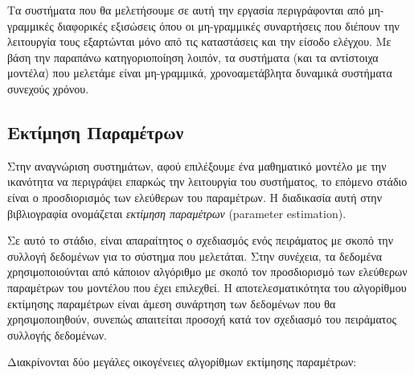 \begin{itemize}
{	
	
	}
\end{itemize}

Τα συστήματα που θα μελετήσουμε σε αυτή την εργασία περιγράφονται από μη-γραμμικές διαφορικές εξισώσεις όπου οι μη-γραμμικές συναρτήσεις που διέπουν την λειτουργία τους εξαρτώνται μόνο από τις καταστάσεις και την είσοδο ελέγχου. Με βάση την παραπάνω κατηγοριοποίηση λοιπόν, τα συστήματα (και τα αντίστοιχα μοντέλα) που μελετάμε είναι μη-γραμμικά, χρονοαμετάβλητα δυναμικά συστήματα συνεχούς χρόνου.

\pagebreak
\subsection{Εκτίμηση Παραμέτρων}
Στην αναγνώριση συστημάτων, αφού επιλέξουμε ένα μαθηματικό μοντέλο με την ικανότητα να περιγράψει επαρκώς την λειτουργία του συστήματος, το επόμενο στάδιο είναι ο προσδιορισμός των ελεύθερων του παραμέτρων. Η διαδικασία αυτή στην βιβλιογραφία ονομάζεται \textit{εκτίμηση παραμέτρων} (parameter estimation).


Σε αυτό το στάδιο, είναι απαραίτητος ο σχεδιασμός ενός πειράματος με σκοπό την συλλογή δεδομένων για το σύστημα που μελετάται. Στην συνέχεια, τα δεδομένα χρησιμοποιούνται από κάποιον αλγόριθμο με σκοπό τον προσδιορισμό των ελεύθερων παραμέτρων του μοντέλου που έχει επιλεχθεί. Η αποτελεσματικότητα του αλγορίθμου εκτίμησης παραμέτρων είναι άμεση συνάρτηση των δεδομένων που θα χρησιμοποιηθούν, συνεπώς απαιτείται προσοχή κατά τον σχεδιασμό του πειράματος συλλογής δεδομένων.

Διακρίνονται δύο μεγάλες οικογένειες αλγορίθμων εκτίμησης παραμέτρων:


